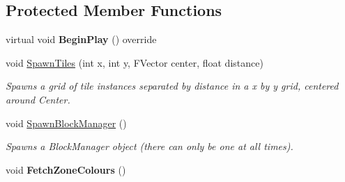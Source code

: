 \subsection*{Protected Member Functions}
\begin{DoxyCompactItemize}
\item 
\mbox{\label{class_a_t_t___grid_manager_a869f6ccb25d2005cc5878daed6b7b811}} 
virtual void {\bfseries Begin\+Play} () override
\item 
void \mbox{\hyperlink{class_a_t_t___grid_manager_a76f1004ca0eab1f77d1591fb85caeb33}{Spawn\+Tiles}} (int x, int y, F\+Vector center, float distance)
\begin{DoxyCompactList}\small\item\em Spawns a grid of tile instances separated by distance in a x by y grid, centered around Center. \end{DoxyCompactList}\item 
\mbox{\label{class_a_t_t___grid_manager_aa5645338890f95f2d400420c29f82952}} 
void \mbox{\hyperlink{class_a_t_t___grid_manager_aa5645338890f95f2d400420c29f82952}{Spawn\+Block\+Manager}} ()
\begin{DoxyCompactList}\small\item\em Spawns a Block\+Manager object (there can only be one at all times). \end{DoxyCompactList}\item 
\mbox{\label{class_a_t_t___grid_manager_a37d3e785443fc21f1f64598c2bdb1977}} 
void {\bfseries Fetch\+Zone\+Colours} ()
\end{DoxyCompactItemize}
